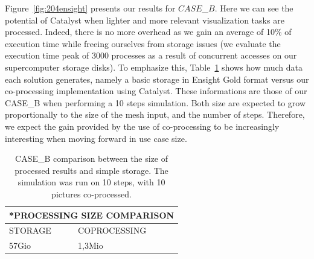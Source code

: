 Figure~\ref{fig:204ensight}
presents our results for $CASE$\_$B$. Here we can see the potential of Catalyst
when 
lighter and more relevant visualization tasks are processed. Indeed, there is no more 
overhead as we gain an average of 10\% of execution time while freeing
ourselves from storage issues (we evaluate the execution time peak of
3000 processes as a result of concurrent accesses on our 
supercomputer storage disks). To emphasize this, Table~\ref{fig:size_tab} shows how much data each
solution generates, namely a basic storage in Ensight Gold format versus our
co-processing implementation using Catalyst. These informations are those of our
CASE\_B when performing a 10 steps simulation. Both size are
expected to grow proportionally to the size of the mesh input, and the number of
steps. Therefore, we expect the gain provided by the use of co-processing 
to be increasingly interesting when moving forward in use case size.

\begin{table}[!h]
\centering
\begin{tabular}{|p{3.5cm}|p{3.5cm}|}
\hline
\multicolumn{2}{|c|}{\textbf{*PROCESSING SIZE COMPARISON}}\\
\hline
STORAGE & COPROCESSING \\
\hline 
57Gio & 1,3Mio \\
\hline 
\end{tabular} 
\caption{CASE\_B comparison between the size of processed results and simple storage. The simulation was run on 10 steps, with 10
pictures co-processed.}
\label{fig:size_tab}
\end{table}

